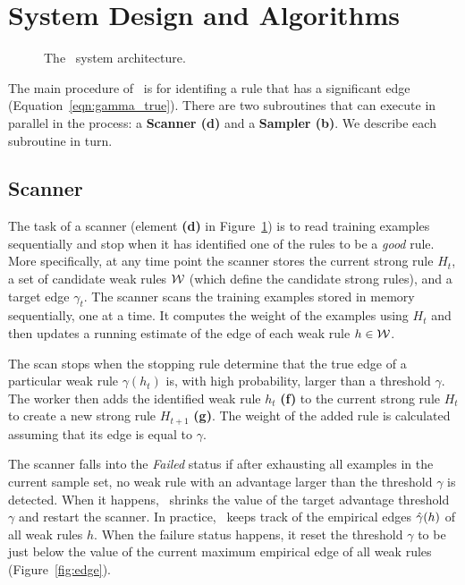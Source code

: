 \section{System Design and Algorithms} \label{sec:Algorithms}

\begin{figure}
\centering
    \caption{The \Sparrow\ system architecture.}\label{fig:architecture}
    \vspace{0pt}
\end{figure}

The main procedure of \Sparrow\ is for identifing a rule that has a significant
edge (Equation~\ref{eqn:gamma_true}). There are two
subroutines that can execute in parallel in the process: a {\bf Scanner (d)} and a
{\bf Sampler (b)}. We describe each subroutine in turn.


\subsection*{Scanner}

The task of a scanner (element {\bf (d)} in Figure~\ref{fig:architecture})
is to read training examples sequentially and stop
when it has identified one of the rules to be a {\em good} rule. More
specifically, at any time point the scanner stores the current strong
rule $H_t$, a set of candidate weak rules ${\cal W}$ (which
define the candidate strong rules), and a target
edge $\gamma_t$. The scanner scans the training examples stored in
memory sequentially, one at a time. It computes the weight of the
examples using $H_t$ and then updates a running estimate of the edge
of each weak rule $h \in {\cal W}$.

The scan stops when the stopping rule determine that
the true edge of a particular weak rule
$\gamma(h_t)$ is, with high probability,
larger than a threshold $\gamma$. The
worker then adds the identified weak rule $h_t$ {\bf (f)} to the current
strong rule $H_t$ to create a new strong rule $H_{t+1}$ {\bf (g)}.
The weight of the added rule is calculated assuming that its edge is
equal to $\gamma$.

The scanner falls into the \textit{Failed} status if after exhausting
all examples in the current sample set, no weak rule with an advantage
larger than the threshold $\gamma$ is detected.
When it happens, \Sparrow\ shrinks the value of the target advantage
threshold $\gamma$ and restart the scanner.
In practice, \Sparrow\ keeps track of the empirical edges $\hat{\gamma}{(h)}$
of all weak rules $h$.
When the failure status happens, it reset the threshold $\gamma$
to be just below the value of the current maximum empirical edge of
all weak rules (Figure~\ref{fig:edge}).

